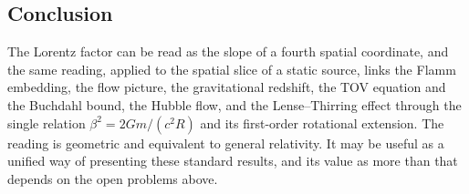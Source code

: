 \documentclass[pdflatex,sn-mathphys-num]{sn-jnl}%
\theoremstyle{thmstyleone}%
\theoremstyle{thmstyletwo}%
\theoremstyle{thmstylethree}%
\begin{document}
\subsection{Conclusion}

The Lorentz factor can be read as the slope of a fourth spatial coordinate, and the same reading, applied to the spatial slice of a static source, links the Flamm embedding, the flow picture, the gravitational redshift, the TOV equation and the Buchdahl bound, the Hubble flow, and the Lense--Thirring effect through the single relation $\beta^2=2Gm/(c^2R)$ and its first-order rotational extension. The reading is geometric and equivalent to general relativity. It may be useful as a unified way of presenting these standard results, and its value as more than that depends on the open problems above.
\end{document}
